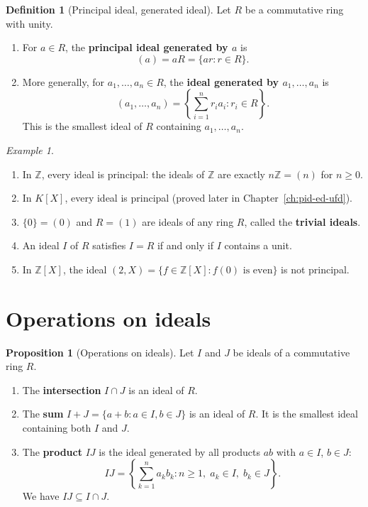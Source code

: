 \documentclass[12pt,a4paper,openany]{book}
\theoremstyle{definition}
\newtheorem{definition}{Definition}[chapter]
\newtheorem{proposition}{Proposition}[chapter]
\theoremstyle{remark}
\newtheorem{example}{Example}[chapter]
\begin{document}
\begin{definition}[Principal ideal, generated ideal]\label{def:principal-ideal}
Let $R$ be a commutative ring with unity.
\begin{enumerate}[label=(\roman*)]
    \item For $a\in R$, the \textbf{principal ideal generated by $a$} is
    \[
        (a) = aR = \{ar : r\in R\}.
    \]
    \item More generally, for $a_1,\ldots,a_n\in R$, the \textbf{ideal generated by $a_1,\ldots,a_n$} is
    \[
        (a_1,\ldots,a_n) = \left\{\sum_{i=1}^n r_ia_i : r_i\in R\right\}.
    \]
    This is the smallest ideal of $R$ containing $a_1,\ldots,a_n$.
\end{enumerate}
\end{definition}

\begin{example}\label{ex:ideals}
\begin{enumerate}[label=(\alph*)]
    \item In $\mathbb{Z}$, every ideal is principal: the ideals of $\mathbb{Z}$ are exactly $n\mathbb{Z}=(n)$ for $n\geq 0$.
    \item In $K[X]$, every ideal is principal (proved later in Chapter~\ref{ch:pid-ed-ufd}).
    \item $\{0\}=(0)$ and $R=(1)$ are ideals of any ring $R$, called the \textbf{trivial ideals}.
    \item An ideal $I$ of $R$ satisfies $I=R$ if and only if $I$ contains a unit.
    \item In $\mathbb{Z}[X]$, the ideal $(2,X)=\{f\in\mathbb{Z}[X] : f(0)\text{ is even}\}$ is not principal.
\end{enumerate}
\end{example}

\section{Operations on ideals}\label{sec:ideal-operations}

\begin{proposition}[Operations on ideals]\label{prop:ideal-operations}
Let $I$ and $J$ be ideals of a commutative ring $R$.
\begin{enumerate}[label=(\roman*)]
    \item The \textbf{intersection} $I\cap J$ is an ideal of $R$.
    \item The \textbf{sum} $I+J=\{a+b : a\in I, b\in J\}$ is an ideal of $R$. It is the smallest ideal containing both $I$ and $J$.
    \item The \textbf{product} $IJ$ is the ideal generated by all products $ab$ with $a\in I$, $b\in J$:
    \[
        IJ = \left\{\sum_{k=1}^n a_kb_k : n\geq 1,\; a_k\in I,\; b_k\in J\right\}.
    \]
    We have $IJ\subseteq I\cap J$.
\end{enumerate}
\end{proposition}
\end{document}
